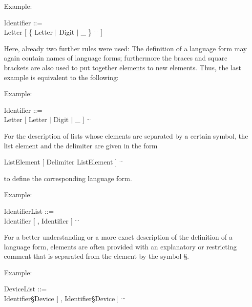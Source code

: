Example:

Identifier ::=\\
\x Letter [ \{ Letter $\mid$ Digit $\mid$ \_ \} $^{...}$ ]

Here, already two further rules were used: The definition of a language
form may again contain names of language forms; furthermore the braces
and square brackets are also used to put together elements to new
elements. Thus, the last example is equivalent to the following:

Example:

Identifier ::=\\
\x Letter [ Letter $\mid$ Digit $\mid$ \_ ] $^{...}$

For the description of lists whose elements are separated by a certain
symbol, the list element and the delimiter are given in the form

ListElement [ Delimiter ListElement ] $^{...}$

to define the corresponding language form.

Example:

IdentifierList ::=\\
\x Identifier [ , Identifier ] $^{...}$

For a better understanding or a more exact description of the definition
of a language form, elements are often provided with an explanatory or
restricting comment that is separated from the element by the symbol
\S .

Example:

DeviceList ::=\\
\x Identifier\S  Device [ , Identifier\S Device ] $^{...}$

